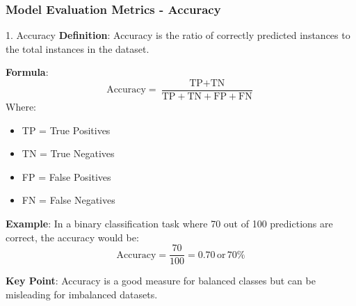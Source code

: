 \documentclass[aspectratio=169]{beamer}
\begin{document}
\begin{frame}[fragile]
  \frametitle{Model Evaluation Metrics - Accuracy}
  \begin{block}{1. Accuracy}
    \textbf{Definition}: Accuracy is the ratio of correctly predicted instances to the total instances in the dataset.
    
    \textbf{Formula}:  
    \begin{equation}
    \text{Accuracy} = \frac{\text{TP} + \text{TN}}{\text{TP} + \text{TN} + \text{FP} + \text{FN}}
    \end{equation}
    Where:  
    \begin{itemize}
        \item TP = True Positives
        \item TN = True Negatives
        \item FP = False Positives
        \item FN = False Negatives
    \end{itemize}

    \textbf{Example}: 
    In a binary classification task where 70 out of 100 predictions are correct, the accuracy would be:
    \begin{equation}
    \text{Accuracy} = \frac{70}{100} = 0.70 \, \text{or} \, 70\%
    \end{equation}

    \textbf{Key Point}: Accuracy is a good measure for balanced classes but can be misleading for imbalanced datasets.
  \end{block}
\end{frame}
\end{document}
